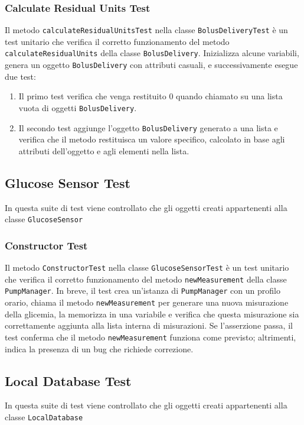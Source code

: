\documentclass[twocolumn]{article}
\begin{document}
\subsubsection{Calculate Residual Units Test}
Il metodo \texttt{calculateResidualUnitsTest} nella classe \texttt{BolusDeliveryTest} è un test unitario che verifica il corretto funzionamento del metodo \texttt{calculateResidualUnits} della classe \texttt{BolusDelivery}. Inizializza alcune variabili, genera un oggetto \texttt{BolusDelivery} con attributi casuali, e successivamente esegue due test:
\begin{enumerate}
    \item Il primo test verifica che venga restituito $0$ quando chiamato su una lista vuota di oggetti \texttt{BolusDelivery}.
    \item Il secondo test aggiunge l'oggetto \texttt{BolusDelivery} generato a una lista e verifica che il metodo restituisca un valore specifico, calcolato in base agli attributi dell'oggetto e agli elementi nella lista.
\end{enumerate}


\subsection{Glucose Sensor Test}
In questa suite di test viene controllato che gli oggetti creati appartenenti alla classe \texttt{GlucoseSensor} 

\subsubsection{Constructor Test}
Il metodo \texttt{ConstructorTest} nella classe \texttt{GlucoseSensorTest} è un test unitario che verifica il corretto funzionamento del metodo \texttt{newMeasurement} della classe \texttt{PumpManager}. In breve, il test crea un'istanza di \texttt{PumpManager} con un profilo orario, chiama il metodo \texttt{newMeasurement} per generare una nuova misurazione della glicemia, la memorizza in una variabile e verifica che questa misurazione sia correttamente aggiunta alla lista interna di misurazioni. Se l'asserzione passa, il test conferma che il metodo \texttt{newMeasurement} funziona come previsto; altrimenti, indica la presenza di un bug che richiede correzione.


\subsection{Local Database Test}
In questa suite di test viene controllato che gli oggetti creati appartenenti alla classe \texttt{LocalDatabase}
\end{document}
